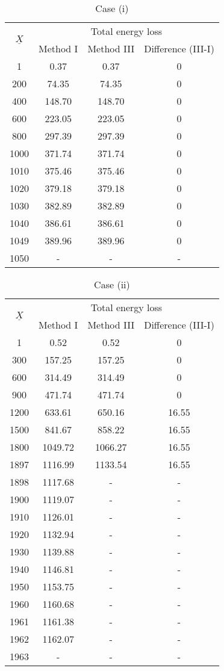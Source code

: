 \documentclass[journal]{IEEEtran}
\begin{document}
\begin{table}[!t]
\renewcommand{\arraystretch}{1.3}
\caption{Case {(i)}}
\label{case1}
\centering
\begin{tabular}{c|c|c|c}
\hline\hline
\multirow{2}{*}{$\underline{X}$}& \multicolumn{3}{c}{Total energy loss}\\ \cline{2-4}
 & Method I  & Method III & Difference (III-I)\\
\hline
1		&0.37			&0.37		&0\\
200	&74.35		&74.35	&0\\
400	&148.70		&148.70	&0\\
600	&223.05		&223.05	&0\\
800	&297.39		&297.39	&0\\
1000&	371.74	&371.74	&0\\
1010&	375.46	&375.46	&0\\
1020&	379.18	&379.18	&0\\
1030&	382.89	&382.89	&0\\
1040&	386.61	&386.61	&0\\
1049&	389.96	&389.96	&0\\
1050&	-				&	-			&	-\\
\hline\hline
\end{tabular}
\end{table}

\begin{table}[!t]
\renewcommand{\arraystretch}{1.3}
\caption{Case {(ii)}}
\label{case2}
\centering
\begin{tabular}{c|c|c|c}
\hline\hline
\multirow{2}{*}{$\underline{X}$}& \multicolumn{3}{c}{Total energy loss}\\ \cline{2-4}
 & Method I  & Method III & Difference (III-I)\\
\hline
1	&	0.52		&	0.52		&0\\
300	&	157.25	&	157.25	&0\\
600	&	314.49	&	314.49	&0\\
900	&	471.74	&	471.74	&0\\
1200&	633.61	&	650.16	&16.55\\
1500&	841.67	&	858.22	&16.55\\
1800&	1049.72	&	1066.27	&16.55\\
1897&	1116.99	&	1133.54	&16.55\\
1898&	1117.68	&	-		&-\\
1900&	1119.07	&	-		&-\\
1910&	1126.01	&	-		&-\\
1920&	1132.94	&	-		&-\\
1930&	1139.88	&	-		&-\\
1940&	1146.81	&	-		&-\\
1950&	1153.75	&	-		&-\\
1960&	1160.68	&	-		&-\\
1961&	1161.38	&	-		&-\\
1962&	1162.07	&	-		&-\\
1963&	-		&	-		&-\\
\hline\hline
\end{tabular}
\end{table}
\end{document}

